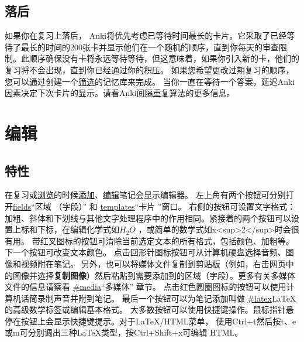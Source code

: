 \documentclass[a4paper]{book}
\begin{document}
	\section{落后}
	
	如果你在复习上落后， Anki将优先考虑已等待时间最长的卡片。它采取了已经等待了最长的时间的200张卡并显示他们在一个随机的顺序，直到你每天的审查限制。此顺序确保没有卡将永远等待等待，但这意味着，如果你引入新的卡，他们的复习将不会出现，直到你已经通过你的积压。
	如果您希望更改过期复习的顺序，您可以通过创建一个\hyperref[filtered]{筛选}的记忆库来完成。
	当你一直在等待一个答案，延迟Anki因素决定下次卡片的显示。请看Anki\hyperref[whatalgorithm]{间隔重复}算法的更多信息。
	
	
	\chapter{编辑}\label{editor}
	
	\section{特性}
	在复习或\hyperref[browser]{浏览}的时候\hyperref[addingnotes]{添加}、\hyperref[editmore]{编辑}笔记会显示编辑器。
	左上角有两个按钮可分别打开\url{fields}“区域
	（字段）” 和
	\url{templates}“卡片
	”窗口。
	右侧的按钮可设置文字格式：加粗、斜体和下划线与其他文字处理程序中的作用相同。紧接着的两个按钮可以设置上标和下标，在编辑化学式如$H_2O$ ，或简单的数学式如x<sup>2</sup>时会很有用。
	带红叉图标的按钮可清除当前选定文本的所有格式，包括颜色、加粗等。
	下一个按钮可改变文本颜色。
	点击回形针图标按钮可从计算机硬盘选择音频、图像和视频附在笔记。 另外，也可以将媒体文件复制到剪贴板（例如，右击网页中的图像并选择\textbf{复制图像}）然后粘贴到需要添加到的区域（字段）。更多有关多媒体文件的信息请察看
	\url{#media}“多媒体” 章节。
	点击红色圆圈图标的按钮可以使用计算机话筒录制声音并附到笔记。
	最后一个按钮可以为笔记添加叫做
	\url{#latex}LaTeX的高级数学标签或编辑基本格式。
	大多数按钮可以使用快捷键操作。鼠标指针悬停在按钮上会显示快捷键提示。对于LaTeX/HTML菜单， 使用Ctrl+t然后按t、e或m可分别调出三种LaTeX类型，按Ctrl+Shift+x可编辑 HTML。
\end{document}
